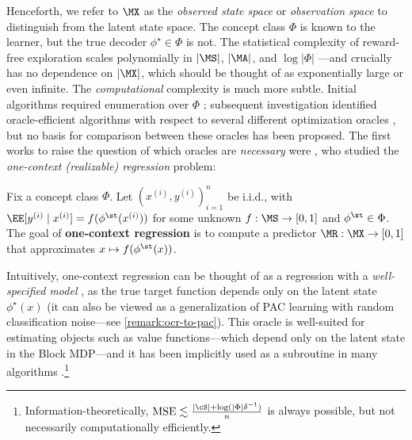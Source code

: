 Henceforth, we refer to $\MX$ as the \emph{observed state space} or \emph{observation space} to distinguish from the latent state space. The concept class $\Phi$ is known to the learner, but the true decoder $\phi^{\star}\in\Phi$ is not. The statistical complexity of reward-free exploration scales polynomially in $|\MS|$, $|\MA|$, and $\log|\Phi|$ \citep{jiang2017contextual}---and crucially has no dependence on $|\MX|$, which should be thought of as exponentially large or even infinite. The \emph{computational} complexity is much more subtle. Initial algorithms required enumeration over $\Phi$ \citep{jiang2017contextual}; subsequent investigation identified oracle-efficient algorithms with respect to several different optimization oracles \citep{misra2020kinematic,zhang2022efficient,mhammedi2023representation,mhammedi2023efficient}, but no basis for comparison between these oracles has been proposed. The first works to raise the question of which oracles are \emph{necessary} were \citet{golowich2024exploring,golowich2024exploration}, who studied the \emph{one-context (realizable) regression} problem:\loose
\begin{definition}\label{def:ocr-informal}
Fix a concept class $\Phi$. Let $(x^{(i)},y^{(i)})_{i=1}^n$ be i.i.d., with $\EE[y^{(i)}\mid{}x^{(i)}] = f(\phi^\st(x^{(i)}))$ for some unknown $f: \MS \to [0,1]$ and $\phi^\st \in \Phi$. The goal of \textbf{one-context regression} is to compute a predictor $\MR: \MX \to [0,1]$ that approximates $x \mapsto f(\phi^\st(x))$.
\end{definition}

Intuitively, one-context regression can be thought of as a regression with a \emph{well-specified model} \citep{tsybakov2009nonparametric,wainwright2019high}, as the true target function depends only on the latent state $\phi^{\star}(x)$ (it can also be viewed as a generalization of PAC learning with random classification noise---see \cref{remark:ocr-to-pac}). This oracle is well-suited for estimating objects such as value functions---which depend only on the latent state in the Block MDP---and it has been implicitly used as a subroutine in many algorithms \citep{foster2020beyond,zhang2022efficient,mhammedi2023representation,mhammedi2023efficient}.\footnote{Information-theoretically,  $\text{MSE}\lesssim\frac{\abs{\cS} + \log(\abs{\Phi}\delta^{-1})}{n}$ is always possible, but not necessarily computationally efficiently.}

